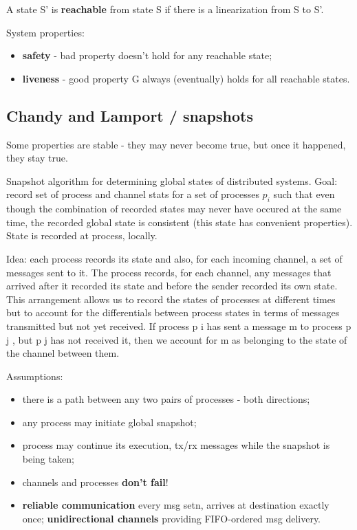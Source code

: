 \documentclass[10pt,a4paper]{article}
\begin{document}
A state S' is \textbf{reachable} from state S if there is a linearization from S to S'.

System properties:
\begin{itemize}
	\item \textbf{safety} - bad property doesn't hold for any reachable state;
	\item \textbf{liveness} - good property G always (eventually) holds for all reachable states.
\end{itemize}

\subsection{Chandy and Lamport / snapshots}
Some properties are stable - they may never become true, but once it happened, they stay true.

Snapshot algorithm for determining global states of distributed systems. Goal: record set of process and channel stats for a set of processes $p_i$ such that even though the combination of recorded states may never have occured at the same time, the recorded global state is consistent (this state has convenient properties). State is recorded at process, locally.

Idea: each process records its state and also, for each incoming channel, a set of messages sent to it. The process records, for each channel, any messages that arrived after it recorded its state and before the sender recorded its own state. This arrangement allows us to record the states of processes at different times but to account for the differentials between process states in terms of messages transmitted but not yet received. If process p i has sent a message m to process p j , but p j has not received it, then we account for m as belonging to the state of the channel between them.


Assumptions:
\begin{itemize}
	\item there is a path between any two pairs of processes - both directions;
	\item any process may initiate global snapshot;
	\item process may continue its execution, tx/rx messages while the snapshot is being taken;
	\item channels and processes \textbf{don't fail}!
	\item \textbf{reliable communication} every msg setn, arrives at destination exactly once;
	\textbf{unidirectional channels} providing FIFO-ordered msg delivery.
\end{itemize}
\end{document}
